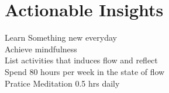 \section*{Actionable Insights}
\begin{Form}
  \CheckBox[name=1]{} Learn Something new everyday\\
  \CheckBox[name=2]{} Achieve mindfulness\\
  \CheckBox[name=3]{} List activities that induces flow and reflect\\
  \CheckBox[name=4]{} Spend 80 hours per week in the state of flow\\
  \CheckBox[name=5]{} Pratice Meditation 0.5 hrs daily
\end{Form}